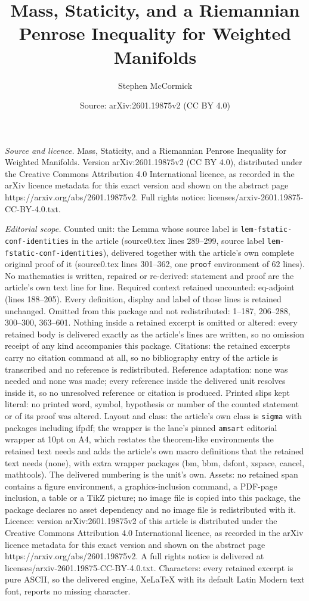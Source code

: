 \documentclass[10pt,a4paper]{amsart}
\title[Mass, Staticity, and a Riemannian Penrose Inequality for Wei]{Mass, Staticity, and a Riemannian Penrose Inequality for Weighted Manifolds}
\author{Stephen McCormick}
\date{Source: arXiv:2601.19875v2 (CC BY 4.0)}
\begin{document}
\maketitle

\noindent\emph{Source and licence.} Mass, Staticity, and a Riemannian Penrose Inequality for Weighted Manifolds. Version arXiv:2601.19875v2 (CC BY 4.0), distributed under the Creative Commons Attribution 4.0 International licence, as recorded in the arXiv licence metadata for this exact version and shown on the abstract page https://arxiv.org/abs/2601.19875v2. Full rights notice: licenses/arxiv-2601.19875-CC-BY-4.0.txt.\par\smallskip

\noindent\textit{Editorial scope.} Counted unit: the Lemma whose source label is \texttt{lem-fstatic-conf-identities} in the article (source0.tex lines 289--299, source label \texttt{lem-fstatic-conf-identities}), delivered together with the article's own complete original proof of it (source0.tex lines 301--362, one \texttt{proof} environment of 62 lines). No mathematics is written, repaired or re-derived: statement and proof are the article's own text line for line. Required context retained uncounted: eq-adjoint (lines 188--205). Every definition, display and label of those lines is retained unchanged. Omitted from this package and not redistributed: 1--187, 206--288, 300--300, 363--601. Nothing inside a retained excerpt is omitted or altered: every retained body is delivered exactly as the article's lines are written, so no omission receipt of any kind accompanies this package. Citations: the retained excerpts carry no citation command at all, so no bibliography entry of the article is transcribed and no reference is redistributed. Reference adaptation: none was needed and none was made; every reference inside the delivered unit resolves inside it, so no unresolved reference or citation is produced. Printed slips kept literal: no printed word, symbol, hypothesis or number of the counted statement or of its proof was altered. Layout and class: the article's own class is \texttt{sigma} with packages including ifpdf; the wrapper is the lane's pinned \texttt{amsart} editorial wrapper at 10pt on A4, which restates the theorem-like environments the retained text needs and adds the article's own macro definitions that the retained text needs (none), with extra wrapper packages (bm, bbm, dsfont, xspace, cancel, mathtools). The delivered numbering is the unit's own. Assets: no retained span contains a figure environment, a graphics-inclusion command, a PDF-page inclusion, a table or a TikZ picture; no image file is copied into this package, the package declares no asset dependency and no image file is redistributed with it. Licence: version arXiv:2601.19875v2 of this article is distributed under the Creative Commons Attribution 4.0 International licence, as recorded in the arXiv licence metadata for this exact version and shown on the abstract page https://arxiv.org/abs/2601.19875v2. A full rights notice is delivered at licenses/arxiv-2601.19875-CC-BY-4.0.txt. Characters: every retained excerpt is pure ASCII, so the delivered engine, XeLaTeX with its default Latin Modern text font, reports no missing character.
\end{document}
